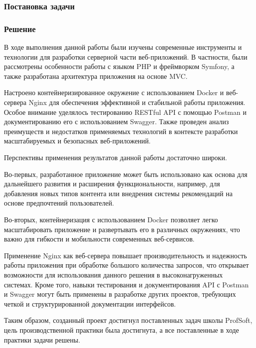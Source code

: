 \documentclass[pract]{SCWorks}
\begin{document}
\subsubsection{Постановка задачи}
\subsubsection{Решение}

\conclusion

В ходе выполнения данной работы были изучены современные инструменты и 
технологии для разработки серверной части веб-приложений. В частности, 
были рассмотрены особенности работы с языком PHP и фреймворком Symfony, 
а также разработана архитектура приложения на основе MVC. 

Настроено контейнеризированное окружение с использованием Docker и веб-сервера 
Nginx для обеспечения эффективной и стабильной работы приложения. Особое 
внимание уделялось тестированию RESTful API с помощью Postman и 
документированию его с использованием Swagger. Также проведен анализ 
преимуществ и недостатков применяемых технологий в контексте разработки 
масштабируемых и безопасных веб-приложений. 

Перспективы применения результатов данной работы достаточно широки. 

Во-первых, разработанное приложение может быть использовано как основа 
для дальнейшего развития и расширения функциональности, например, для 
добавления новых типов контента или внедрения системы рекомендаций на 
основе предпочтений пользователей. 

Во-вторых, контейнеризация с использованием Docker позволяет легко 
масштабировать приложение и развертывать его в различных окружениях, 
что важно для гибкости и мобильности современных веб-сервисов. 

Применение Nginx как веб-сервера повышает производительность и надежность 
работы приложения при обработке большого количества запросов, что открывает 
возможности для использования данного решения в высоконагруженных системах. 
Кроме того, навыки тестирования и документирования API с Postman и Swagger 
могут быть применены в разработке других проектов, требующих четкой и 
структурированной документации интерфейсов.

Таким образом, созданный проект достигнул поставленных задач школы ProfSoft,
цель производственной практики была достигнута, а все поставленные в ходе
практики задачи решены.
\end{document}

